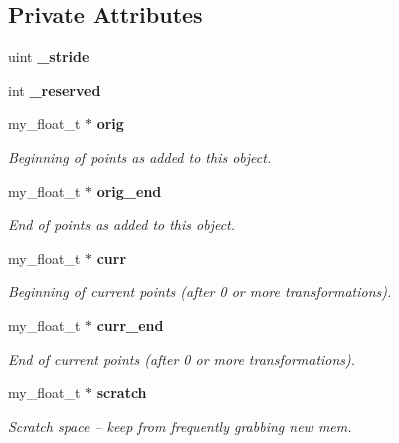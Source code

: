\subsection*{Private Attributes}
\begin{CompactItemize}
\item 
uint \textbf{\_\-stride}\label{classSimSite3D_1_1my__float__array_4af7ff17850cdafd9a355127d0f2cca0}

\item 
int \textbf{\_\-reserved}\label{classSimSite3D_1_1my__float__array_44dc5f56c5c8597129fcc91bf52bd093}

\item 
my\_\-float\_\-t $\ast$ \bf{orig}\label{classSimSite3D_1_1my__float__array_7bab1066585311c5b0e185761dcafd05}

\begin{CompactList}\small\item\em Beginning of points as added to this object. \item\end{CompactList}\item 
my\_\-float\_\-t $\ast$ \bf{orig\_\-end}\label{classSimSite3D_1_1my__float__array_22aefb5abe3a4e1ada9cacfb6b5464b3}

\begin{CompactList}\small\item\em End of points as added to this object. \item\end{CompactList}\item 
my\_\-float\_\-t $\ast$ \bf{curr}\label{classSimSite3D_1_1my__float__array_4dfcdb66fffd9a861988c5343f263ffd}

\begin{CompactList}\small\item\em Beginning of current points (after 0 or more transformations). \item\end{CompactList}\item 
my\_\-float\_\-t $\ast$ \bf{curr\_\-end}\label{classSimSite3D_1_1my__float__array_38577011f5ee6e411ef96f3a8b8143b2}

\begin{CompactList}\small\item\em End of current points (after 0 or more transformations). \item\end{CompactList}\item 
my\_\-float\_\-t $\ast$ \bf{scratch}\label{classSimSite3D_1_1my__float__array_4bab597976578f4d790991065b9b417e}

\begin{CompactList}\small\item\em Scratch space -- keep from frequently grabbing new mem. \item\end{CompactList}\end{CompactItemize}


